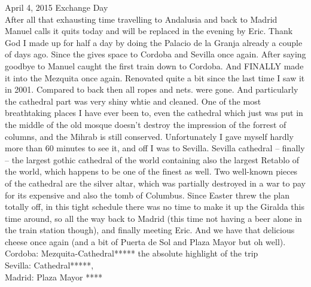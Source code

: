 April 4, 2015 Exchange Day\\
After all that exhausting time travelling to Andalusia and back to Madrid Manuel calls it quits today and will be replaced in the evening by Eric. Thank God I made up for half a day by doing the Palacio de la Granja already a couple of days ago. Since the gives space to Cordoba and Sevilla once again. After saying goodbye to Manuel caught the first train down to Cordoba. And FINALLY made it into the Mezquita once again. Renovated quite a bit since the last time I saw it in 2001. Compared to back then all ropes and nets. were gone. And particularly the cathedral part was very shiny whtie and cleaned. One of the most breathtaking places I have ever been to, even the cathedral which just was put in the middle of the old mosque doesn't destroy the impression of the forrest of columns, and the Mihrab is still conserved. Unfortunately I gave myself hardly more than 60 minutes to see it, and off I was to Sevilla. Sevilla cathedral -- finally -- the largest gothic cathedral of the world containing also the largest Retablo of the world, which happens to be one of the finest as well. Two well-known pieces of the cathedral are the silver altar, which was partially destroyed in a war to pay for its expensive and also the tomb of Columbus. Since Easter threw the plan totally off, in this tight schedule there was no time to make it up the Giralda this time around, so all the way back to Madrid (this time not having a beer alone in the train station though), and finally meeting Eric. And we have that delicious cheese once again (and a bit of Puerta de Sol and Plaza Mayor but oh well).\\

Cordoba:
Mezquita-Cathedral***** the absolute highlight of the trip\\
Sevilla:
Cathedral*****,\\
Madrid:
Plaza Mayor ****\\


